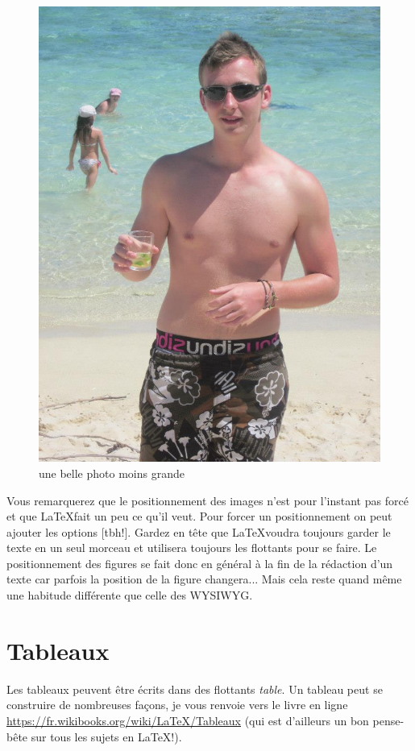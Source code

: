 \documentclass[11pt,a4paper]{article}
\begin{document}
\begin{figure}[h]
	\centering
	\includegraphics[width=\linewidth]{photo.jpg}
	\caption{une belle photo moins grande}
	\label{fig:not_big_photo}
\end{figure}

Vous remarquerez que le positionnement des images n'est pour l'instant pas forcé et que \LaTeX fait un peu ce qu'il veut. Pour forcer un positionnement on peut ajouter les options [tbh!]. Gardez en tête que \LaTeX voudra toujours garder le texte en un seul morceau et utilisera toujours les flottants pour se faire. Le positionnement des figures se fait donc en général à la fin de la rédaction d'un texte car parfois la position de la figure changera... Mais cela reste quand même une habitude différente que celle des WYSIWYG.

\section{Tableaux}
Les tableaux peuvent être écrits dans des flottants \textit{table}. Un tableau peut se construire de nombreuses façons, je vous renvoie vers le livre en ligne \url{https://fr.wikibooks.org/wiki/LaTeX/Tableaux} (qui est d'ailleurs un bon pense-bête sur tous les sujets en \LaTeX !).
\end{document}
